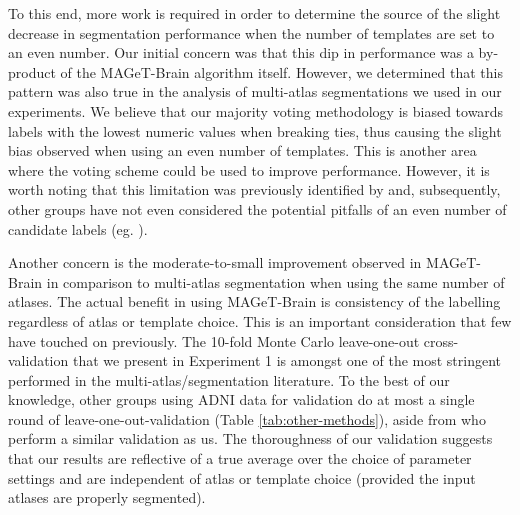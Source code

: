 \documentclass{article}\usepackage{graphicx, color}
\newcommand{\mb}{MAGeT-Brain }
\begin{document}
To this end, more work is required in order to determine the source of the
slight decrease in segmentation performance when the number of templates are set
to an even number.  Our initial concern was that this dip in performance was a
by-product of the \mb algorithm itself.  However, we determined that
this pattern was also true in the analysis of multi-atlas segmentations we used
in our experiments.  We believe that our majority voting methodology is biased
towards labels with the lowest numeric values when breaking ties, thus causing
the slight bias observed when using an even number of templates. This is another
area where the voting scheme could be used to improve performance. However, it
is worth noting that this limitation was previously identified by
\citet{Heckemann2006a} and, subsequently, other groups have not even considered
the potential pitfalls of an even number of candidate labels (eg.
\citet{Leung2010}).

Another concern is the moderate-to-small improvement observed in \mb in
comparison to multi-atlas segmentation when using the same number of atlases.
The actual benefit in using \mb is consistency of the labelling regardless of
atlas or template choice. This is an important consideration that few have
touched on previously. The 10-fold Monte Carlo leave-one-out cross-validation that we present
in Experiment 1 is amongst one of the most stringent performed in the
multi-atlas/segmentation literature.  To the best of our knowledge, other groups
using ADNI data for validation do at most a single round of leave-one-out-validation
(Table \ref{tab:other-methods}), aside from \citep{Wang2011} who perform a 
similar validation as us. The thoroughness of our validation suggests that
our results are reflective of a true average over the choice of parameter
settings and are independent of atlas or template choice (provided the input
atlases are properly segmented).  

\end{document}
